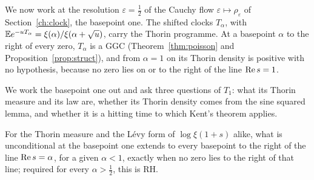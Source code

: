 \label{chap:basepoint}

We now work at the resolution $\varepsilon=\frac12$ of the Cauchy flow $\varepsilon\mapsto\rho_\varepsilon$ of Section~\ref{ch:clock}, the basepoint one. The shifted clocks $T_\alpha$, with $\mathbb{E} e^{-uT_\alpha}=\xi(\alpha)/\xi(\alpha+\sqrt u)$, carry the Thorin programme. At a basepoint $\alpha$ to the right of every zero, $T_\alpha$ is a GGC (Theorem~\ref{thm:poisson} and Proposition~\ref{prop:struct}), and from $\alpha=1$ on its Thorin density is positive with no hypothesis, because no zero lies on or to the right of the line $\operatorname{Re} s=1$.

We work the basepoint one out and ask three questions of $T_1$: what its Thorin measure and its law are, whether its Thorin density comes from the sine squared lemma, and whether it is a hitting time to which Kent's theorem applies.

For the Thorin measure and the L\'evy form of $\log\xi(1+s)$ alike, what is unconditional at the basepoint one extends to every basepoint to the right of the line $\operatorname{Re} s=\alpha$, for a given $\alpha<1$, exactly when no zero lies to the right of that line; required for every $\alpha>\frac12$, this is RH.
